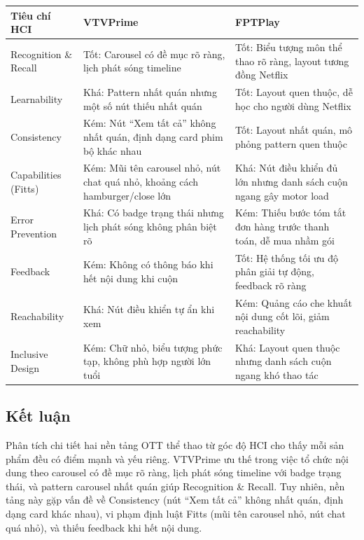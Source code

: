 \begin{center}
\small
\begin{tabularx}{\textwidth}{|l|X|X|}
\hline
\textbf{Tiêu chí HCI} & \textbf{VTVPrime} & \textbf{FPTPlay} \\
\hline
Recognition \& Recall & Tốt: Carousel có đề mục rõ ràng, lịch phát sóng timeline & Tốt: Biểu tượng môn thể thao rõ ràng, layout tương đồng Netflix \\
\hline
Learnability & Khá: Pattern nhất quán nhưng một số nút thiếu nhất quán & Tốt: Layout quen thuộc, dễ học cho người dùng Netflix \\
\hline
Consistency & Kém: Nút ``Xem tất cả'' không nhất quán, định dạng card phim bộ khác nhau & Tốt: Layout nhất quán, mô phỏng pattern quen thuộc \\
\hline
Capabilities (Fitts) & Kém: Mũi tên carousel nhỏ, nút chat quá nhỏ, khoảng cách hamburger/close lớn & Khá: Nút điều khiển đủ lớn nhưng danh sách cuộn ngang gây motor load \\
\hline
Error Prevention & Khá: Có badge trạng thái nhưng lịch phát sóng không phân biệt rõ & Kém: Thiếu bước tóm tắt đơn hàng trước thanh toán, dễ mua nhầm gói \\
\hline
Feedback & Kém: Không có thông báo khi hết nội dung khi cuộn & Tốt: Hệ thống tối ưu độ phân giải tự động, feedback rõ ràng \\
\hline
Reachability & Khá: Nút điều khiển tự ẩn khi xem & Kém: Quảng cáo che khuất nội dung cốt lõi, giảm reachability \\
\hline
Inclusive Design & Kém: Chữ nhỏ, biểu tượng phức tạp, không phù hợp người lớn tuổi & Khá: Layout quen thuộc nhưng danh sách cuộn ngang khó thao tác \\
\hline
\end{tabularx}
\end{center}

\subsection{Kết luận}

Phân tích chi tiết hai nền tảng OTT thể thao từ góc độ HCI cho thấy mỗi sản phẩm đều có điểm mạnh và yếu riêng. VTVPrime ưu thế trong việc tổ chức nội dung theo carousel có đề mục rõ ràng, lịch phát sóng timeline với badge trạng thái, và pattern carousel nhất quán giúp Recognition \& Recall. Tuy nhiên, nền tảng này gặp vấn đề về Consistency (nút ``Xem tất cả'' không nhất quán, định dạng card khác nhau), vi phạm định luật Fitts (mũi tên carousel nhỏ, nút chat quá nhỏ), và thiếu feedback khi hết nội dung.

